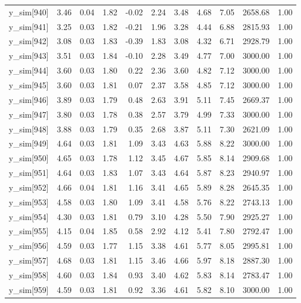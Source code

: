 \begin{table}[ht]
\begin{tabular}{rrrrrrrrrrr}
  y\_sim[940] & 3.46 & 0.04 & 1.82 & -0.02 & 2.24 & 3.48 & 4.68 & 7.05 & 2658.68 & 1.00 \\ 
  y\_sim[941] & 3.25 & 0.03 & 1.82 & -0.21 & 1.96 & 3.28 & 4.44 & 6.88 & 2815.93 & 1.00 \\ 
  y\_sim[942] & 3.08 & 0.03 & 1.83 & -0.39 & 1.83 & 3.08 & 4.32 & 6.71 & 2928.79 & 1.00 \\ 
  y\_sim[943] & 3.51 & 0.03 & 1.84 & -0.10 & 2.28 & 3.49 & 4.77 & 7.00 & 3000.00 & 1.00 \\ 
  y\_sim[944] & 3.60 & 0.03 & 1.80 & 0.22 & 2.36 & 3.60 & 4.82 & 7.12 & 3000.00 & 1.00 \\ 
  y\_sim[945] & 3.60 & 0.03 & 1.81 & 0.07 & 2.37 & 3.58 & 4.85 & 7.12 & 3000.00 & 1.00 \\ 
  y\_sim[946] & 3.89 & 0.03 & 1.79 & 0.48 & 2.63 & 3.91 & 5.11 & 7.45 & 2669.37 & 1.00 \\ 
  y\_sim[947] & 3.80 & 0.03 & 1.78 & 0.38 & 2.57 & 3.79 & 4.99 & 7.33 & 3000.00 & 1.00 \\ 
  y\_sim[948] & 3.88 & 0.03 & 1.79 & 0.35 & 2.68 & 3.87 & 5.11 & 7.30 & 2621.09 & 1.00 \\ 
  y\_sim[949] & 4.64 & 0.03 & 1.81 & 1.09 & 3.43 & 4.63 & 5.88 & 8.22 & 3000.00 & 1.00 \\ 
  y\_sim[950] & 4.65 & 0.03 & 1.78 & 1.12 & 3.45 & 4.67 & 5.85 & 8.14 & 2909.68 & 1.00 \\ 
  y\_sim[951] & 4.64 & 0.03 & 1.83 & 1.07 & 3.43 & 4.64 & 5.87 & 8.23 & 2940.97 & 1.00 \\ 
  y\_sim[952] & 4.66 & 0.04 & 1.81 & 1.16 & 3.41 & 4.65 & 5.89 & 8.28 & 2645.35 & 1.00 \\ 
  y\_sim[953] & 4.58 & 0.03 & 1.80 & 1.09 & 3.41 & 4.58 & 5.76 & 8.22 & 2743.13 & 1.00 \\ 
  y\_sim[954] & 4.30 & 0.03 & 1.81 & 0.79 & 3.10 & 4.28 & 5.50 & 7.90 & 2925.27 & 1.00 \\ 
  y\_sim[955] & 4.15 & 0.04 & 1.85 & 0.58 & 2.92 & 4.12 & 5.41 & 7.80 & 2792.47 & 1.00 \\ 
  y\_sim[956] & 4.59 & 0.03 & 1.77 & 1.15 & 3.38 & 4.61 & 5.77 & 8.05 & 2995.81 & 1.00 \\ 
  y\_sim[957] & 4.68 & 0.03 & 1.81 & 1.15 & 3.46 & 4.66 & 5.97 & 8.18 & 2887.30 & 1.00 \\ 
  y\_sim[958] & 4.60 & 0.03 & 1.84 & 0.93 & 3.40 & 4.62 & 5.83 & 8.14 & 2783.47 & 1.00 \\ 
  y\_sim[959] & 4.59 & 0.03 & 1.81 & 0.92 & 3.36 & 4.61 & 5.82 & 8.10 & 3000.00 & 1.00 \\ 

\end{tabular}
\end{table}
